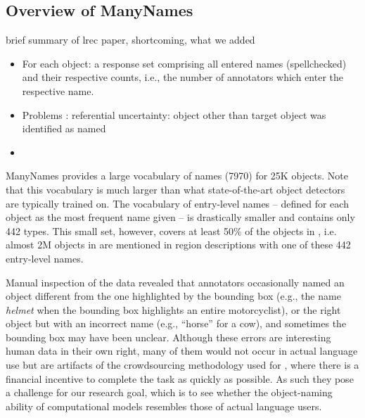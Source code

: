 \subsection{Overview of ManyNames}
\label{sect:mn_overview}

brief summary of lrec paper, shortcoming, what we added

\begin{itemize}
	\item For each object: a response set comprising all entered names (spellchecked) and their respective counts, i.e., the number of annotators which enter the respective name.
	\item Problems : referential uncertainty: object other than target object was  identified as named
	\item {}
\end{itemize}


ManyNames provides a large vocabulary of names (7970) for 25K objects.
Note that this vocabulary is much larger than what state-of-the-art object detectors are typically trained on. 
The vocabulary of entry-level names -- defined for each object as the most frequent name given -- is drastically smaller and contains only 442 types. 
This small set, however, covers at least 50\% of the objects in \vg, i.e. almost 2M objects in \vg are mentioned in region descriptions with one of these 442 entry-level names.



Manual inspection of the \mn data revealed that annotators occasionally named an object different from the one highlighted by the bounding box (e.g., the name \emph{helmet} when the bounding box highlights an entire motorcyclist), or the right object but with an incorrect name (e.g., ``horse'' for a cow), and sometimes the bounding box may have been unclear.
Although these errors are interesting human data in their own right, many of them would not occur in actual language use but are artifacts of the crowdsourcing methodology used for \mn, where there is a financial incentive to complete the task as quickly as possible.
As such they pose a challenge for our research goal, which is to see whether the object-naming ability of computational models resembles those of actual language users.

